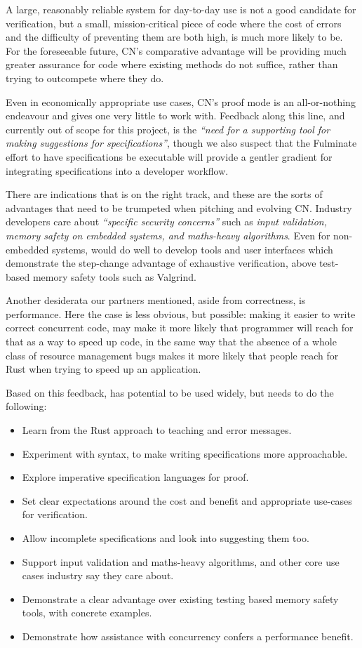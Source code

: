 A large, reasonably reliable system for day-to-day use is not a good candidate
for verification, but a small, mission-critical piece of code where the cost of
errors and the difficulty of preventing them are both high, is much more likely
to be. For the foreseeable future, CN's comparative advantage will be providing
much greater assurance for code where existing methods do not suffice, rather
than trying to outcompete where they do.

Even in economically appropriate use cases, CN's proof mode is an
all-or-nothing endeavour and gives one very little to work with. Feedback along
this line, and currently out of scope for this project, is the \emph{``need for
a supporting tool for making suggestions for  specifications''}, though we also
suspect that the Fulminate effort to have specifications be executable will
provide a gentler gradient for integrating specifications into a developer
workflow.

There are indications that  is on the right track, and these are the
sorts of advantages that need to be trumpeted when pitching and evolving CN.\@
Industry developers care about \emph{``specific security concerns''} such as
\emph{input validation, memory safety on embedded systems, and maths-heavy
algorithms}. Even for non-embedded systems,  would do well to develop
tools and user interfaces which demonstrate the step-change advantage of
exhaustive verification, above test-based memory safety tools such as Valgrind.

Another desiderata our partners mentioned, aside from correctness, is
performance. Here the case is less obvious, but possible: making it easier to
write correct concurrent code, may make it more likely that programmer will
reach for that as a way to speed up code, in the same way that the absence of a
whole class of resource management bugs makes it more likely that people reach
for Rust when trying to speed up an application.

Based on this feedback,  has potential to be used widely, but needs to
do the following:
\begin{itemize}
    \item Learn from the Rust approach to teaching and error messages.
    \item Experiment with syntax, to make writing specifications more
        approachable.
    \item Explore imperative specification languages for proof.
    \item Set clear expectations around the cost and benefit and appropriate
        use-cases for verification.
    \item Allow incomplete specifications and look into suggesting them too.
    \item Support input validation and maths-heavy algorithms, and other core
        use cases industry say they care about.
    \item Demonstrate a clear advantage over existing testing based memory
        safety tools, with concrete examples.
    \item Demonstrate how assistance with concurrency confers a performance
        benefit.
\end{itemize}


